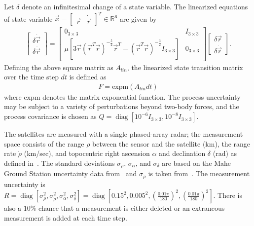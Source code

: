 \documentclass[letterpaper, 10pt, conference]{ieeeconf}
\newcommand{\expm}{\ensuremath{\mathrm{expm}}}
\newcommand{\diag}{\mathop{\mathrm{diag}}\nolimits}
\renewcommand{\Re}{\ensuremath{\mathbb{R}}}
\begin{document}
Let $\delta$ denote an infinitesimal change of a state variable.
The linearized equations of state variable $\vec x=\begin{bmatrix}\vec r & \dot{\vec r}\end{bmatrix}^T\in\Re^6$ are given by
\begin{align}
\begin{bmatrix}
\delta\dot{\vec r} \\ \delta\ddot{\vec r}
\end{bmatrix}
=
\begin{bmatrix}
0_{3\times3} & I_{3\times3} \\
\mu\left[3\vec r({\vec r}^T\vec r)^{-\frac52}{\vec r}^T-({\vec r}^T\vec r)^{-\frac32}I_{3\times3}\right] & 0_{3\times3}
\end{bmatrix}
\begin{bmatrix}
\delta\vec r \\ \delta\dot{\vec r}
\end{bmatrix}
.
\end{align}
Defining the above square matrix as $A_{lin}$, the linearized state transition matrix over the time step $dt$ is defined as
\begin{align}
F=\expm{(A_{lin}dt)}
\end{align}
where $\expm$ denotes the matrix exponential function.
The process uncertainty may be subject to a variety of perturbations beyond two-body forces, and the process covariance is chosen as $Q=\diag[10^{-6}I_{3\times3}, 10^{-8}I_{3\times3}]$.

The satellites are measured with a single phased-array radar; the measurement space consists of the range $\rho$ between the sensor and the satellite (km), the range rate $\dot\rho$ (km/sec), and topocentric right ascension $\alpha$ and declination $\delta$ (rad) as defined in~\cite{Val01}.
The standard deviations $\sigma_\rho$, $\sigma_\alpha$, and $\sigma_\delta$ are based on the Mahe Ground Station uncertainty data from~\cite{VerSauSco04} and $\sigma_{\dot\rho}$ is taken from~\cite{KurAriAriEfe10}. The measurement uncertainty is $R=\diag[\sigma_\rho^2, \sigma_{\dot\rho}^2, \sigma_\alpha^2, \sigma_\delta^2]=\diag[0.15^2, 0.005^2, (\frac{0.01\pi}{180})^2, (\frac{0.01\pi}{180})^2]$. There is also a $10\%$ chance that a measurement is either deleted or an extraneous measurement is added at each time step.
\end{document}

